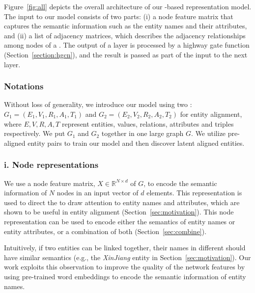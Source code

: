     Figure~\ref{fig:all} depicts the overall architecture of our \RGCN-based \KG representation model. 	
  	The input to our model consists of two parts: (i) a node feature matrix that captures the semantic information such as the entity
  names and their attributes, and (ii) a list of adjacency matrices, which describes the adjacency relationships among nodes of a \KG.
    The output of a \RGCN layer is processed by a highway gate function (Section~\ref{section:hgcn}), and the result is passed as part of
    the input to the next layer.

\subsubsection{Notations}

Without loss of generality, we introduce our model using two \KGs: $G_1 = (E_1,V_1,R_1,A_1,T_1)$ and $G_2 = (E_2,V_2,R_2,A_2,T_2)$ for
entity alignment, where $E,V,R,A,T$ represent entities, values, relations, attributes and triples respectively. 	We put $G_1$ and $G_2$
together in one large graph $G$. We utilize pre-aligned entity pairs to train our model and then discover latent aligned entities.

%



\subsubsection{i. Node representations}
	\label{subsection:Node Representations}
   We use a node feature matrix, $X \in \mathbb{R}^{N \times d}$ of $G$, to encode the semantic information of $N$  nodes in an
   input vector of $d$ elements. This representation is used to direct the \RGCN to draw attention to entity names and attributes, which are shown to be
   useful in entity alignment (Section~\ref{sec:motivation}). This node representation can be used to encode either the semantics of entity names
   or entity attributes, or a combination of both (Section~\ref{sec:combine}).


	
	\label{wordvector}
	Intuitively, if two entities can be linked together, their names in different \KGs should have similar semantics (e.g., the \emph{XinJiang} entity in Section~\ref{sec:motivation}).
    Our work exploits this observation to improve the quality of the network features by using pre-trained word embeddings to encode the semantic
    information of entity names.

